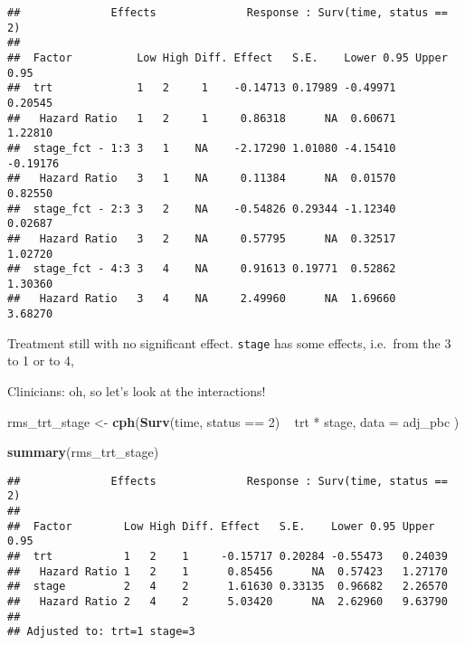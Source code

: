 \documentclass[]{book}
\newenvironment{Shaded}{\begin{snugshade}}{\end{snugshade}}
\newcommand{\KeywordTok}[1]{\textcolor[rgb]{0.13,0.29,0.53}{\textbf{{#1}}}}
\newcommand{\DataTypeTok}[1]{\textcolor[rgb]{0.13,0.29,0.53}{{#1}}}
\newcommand{\DecValTok}[1]{\textcolor[rgb]{0.00,0.00,0.81}{{#1}}}
\newcommand{\StringTok}[1]{\textcolor[rgb]{0.31,0.60,0.02}{{#1}}}
\newcommand{\OtherTok}[1]{\textcolor[rgb]{0.56,0.35,0.01}{{#1}}}
\newcommand{\NormalTok}[1]{{#1}}
\theoremstyle{definition}
\theoremstyle{definition}
\theoremstyle{definition}
\theoremstyle{remark}
\begin{document}
\begin{verbatim}
##              Effects              Response : Surv(time, status == 2) 
## 
##  Factor          Low High Diff. Effect   S.E.    Lower 0.95 Upper 0.95
##  trt             1   2     1    -0.14713 0.17989 -0.49971    0.20545  
##   Hazard Ratio   1   2     1     0.86318      NA  0.60671    1.22810  
##  stage_fct - 1:3 3   1    NA    -2.17290 1.01080 -4.15410   -0.19176  
##   Hazard Ratio   3   1    NA     0.11384      NA  0.01570    0.82550  
##  stage_fct - 2:3 3   2    NA    -0.54826 0.29344 -1.12340    0.02687  
##   Hazard Ratio   3   2    NA     0.57795      NA  0.32517    1.02720  
##  stage_fct - 4:3 3   4    NA     0.91613 0.19771  0.52862    1.30360  
##   Hazard Ratio   3   4    NA     2.49960      NA  1.69660    3.68270
\end{verbatim}

Treatment still with no significant effect. \texttt{stage} has some
effects, i.e.~from the 3 to 1 or to 4,

Clinicians: oh, so let's look at the interactions!

\begin{Shaded}
\begin{Highlighting}[]
\NormalTok{rms_trt_stage <-}\StringTok{ }\KeywordTok{cph}\NormalTok{(}\KeywordTok{Surv}\NormalTok{(time, status ==}\StringTok{ }\DecValTok{2}\NormalTok{) ~}\StringTok{ }\NormalTok{trt *}\StringTok{ }\NormalTok{stage,}
  \DataTypeTok{data =} \NormalTok{adj_pbc}
\NormalTok{)}

\KeywordTok{summary}\NormalTok{(rms_trt_stage)}
\end{Highlighting}
\end{Shaded}

\begin{verbatim}
##              Effects              Response : Surv(time, status == 2) 
## 
##  Factor        Low High Diff. Effect   S.E.    Lower 0.95 Upper 0.95
##  trt           1   2    1     -0.15717 0.20284 -0.55473   0.24039   
##   Hazard Ratio 1   2    1      0.85456      NA  0.57423   1.27170   
##  stage         2   4    2      1.61630 0.33135  0.96682   2.26570   
##   Hazard Ratio 2   4    2      5.03420      NA  2.62960   9.63790   
## 
## Adjusted to: trt=1 stage=3
\end{verbatim}

\begin{Shaded}
\end{Shaded}
\end{document}
